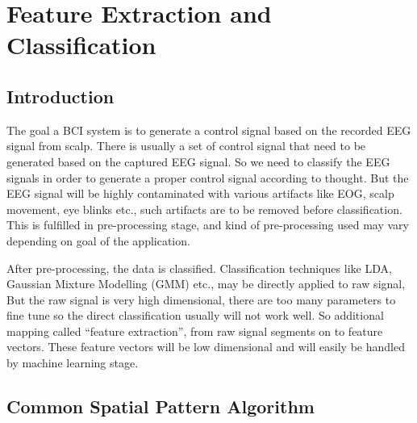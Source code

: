 \chapter{ Feature Extraction and Classification}

\section{Introduction}

The goal a BCI system is to generate a control signal based on the recorded EEG signal from scalp. There is usually a set of control signal that need to be generated based on the captured EEG signal. So we need to classify the EEG signals in order to generate a proper control signal according to thought. But the EEG signal will be highly contaminated with various artifacts like EOG, scalp movement, eye blinks etc., such artifacts are to be removed before classification. This is fulfilled in pre-processing stage, and kind of pre-processing used may vary depending on goal of the application.

After pre-processing, the data is classified. Classification techniques like LDA, Gaussian Mixture Modelling (GMM) etc., may be directly applied to raw signal, But the raw signal is very high dimensional, there are too many parameters to fine tune so the direct classification usually will not work well. So additional mapping called “feature extraction”, from raw signal segments on to feature vectors. These feature vectors will be low dimensional and will easily be handled by machine learning stage. 
\section{Common Spatial Pattern Algorithm}

